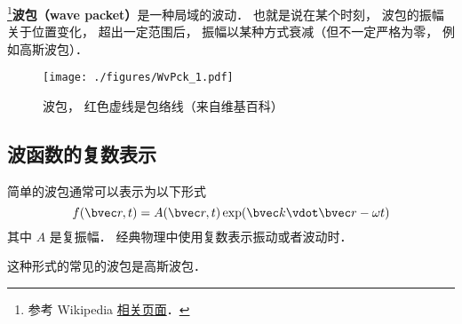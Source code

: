 

\footnote{参考 Wikipedia \href{https://en.wikipedia.org/wiki/Wave_packet}{相关页面}．}\textbf{波包（wave packet）}是一种局域的波动． 也就是说在某个时刻， 波包的振幅关于位置变化， 超出一定范围后， 振幅以某种方式衰减（但不一定严格为零， 例如高斯波包）．

\begin{figure}[ht]
\centering
\texttt{[image: ./figures/WvPck\_1.pdf]}
\caption{波包， 红色虚线是包络线（来自维基百科）} \label{WvPck_fig1}
\end{figure}

\subsection{波函数的复数表示}
简单的波包通常可以表示为以下形式
\begin{equation}
f(\bvec r, t) = A(\bvec r, t) \exp(\bvec k \vdot \bvec r - \omega t)
\end{equation}
其中 $A$ 是复振幅． 经典物理中使用复数表示振动或者波动时．

这种形式的常见的波包是高斯波包．
